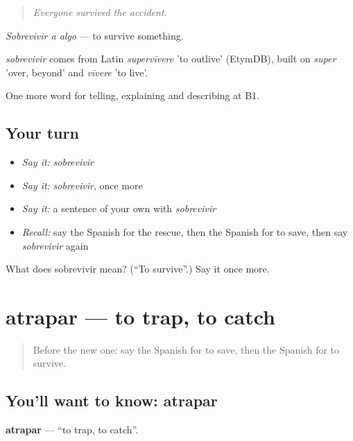 \begin{quote}
\emph{Everyone survived the accident.}
\end{quote}

\emph{Sobrevivir a algo} — to survive something.

\begin{cousinweb}
\emph{sobrevivir} comes from Latin \emph{supervīvere} 'to outlive' (EtymDB), built on \emph{super} 'over, beyond' and \emph{vīvere} 'to live'.
\end{cousinweb}

\begin{grammarlens}[title={What you've built}]
One more word for telling, explaining and describing at B1.
\end{grammarlens}

\subsection*{Your turn}
\begin{itemize}
\raggedright
  \item \emph{Say it:} \emph{sobrevivir}
  \item \emph{Say it:} \emph{sobrevivir}, once more
  \item \emph{Say it:} a sentence of your own with \emph{sobrevivir}
  \item \emph{Recall:} say the Spanish for the rescue, then the Spanish for to save, then say \emph{sobrevivir} again
\end{itemize}

\begin{tcolorbox}[breakable,colback=teal!4,colframe=teal!35!black,title={Before you move on}]
What does sobrevivir mean? (\textquotedblleft{}To survive\textquotedblright{}.) Say it once more.
\end{tcolorbox}
\section[atrapar]{atrapar — to trap, to catch}

\label{lesson:ES-C526-atrapar}



\begin{quote}
Before the new one: say the Spanish for to save, then the Spanish for to survive.
\end{quote}

\subsection*{You'll want to know: atrapar}
\textbf{atrapar} — \textquotedblleft{}to trap, to catch\textquotedblright{}.

